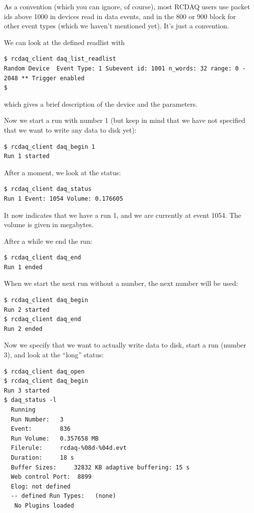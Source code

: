 \documentclass{article}[11pt]
\begin{document}
As a convention (which you can ignore, of course), most RCDAQ users
use packet ids above 1000 in devices read in data events, and in the
800 or 900 block for other event types (which we haven't mentioned
yet). It's just a convention.


We can look at the defined readlist with  

\begin{verbatim}
$ rcdaq_client daq_list_readlist
Random Device  Event Type: 1 Subevent id: 1001 n_words: 32 range: 0 - 2048 ** Trigger enabled
$ 
\end{verbatim}

which gives a brief description of the device and the parameters.

Now we start a run with number 1 (but keep in mind that we have not
specified that we want to write any data to disk yet):

\begin{verbatim}
$ rcdaq_client daq_begin 1
Run 1 started
\end{verbatim}

After a moment, we look at the status:

\begin{verbatim}
$ rcdaq_client daq_status 
Run 1 Event: 1054 Volume: 0.176605
\end{verbatim}

It now indicates that we have a run 1, and we are currently at event
1054. The volume is given in megabytes.

After a while we end the run:

\begin{verbatim}
$ rcdaq_client daq_end
Run 1 ended
\end{verbatim}

When we start the next run without a number, the next number will be used:

\begin{verbatim}
$ rcdaq_client daq_begin
Run 2 started
$ rcdaq_client daq_end
Run 2 ended
\end{verbatim}

Now we specify that we want to actually write data to disk, start a
run (number 3), and look at the ``long'' status:

\begin{verbatim}
$ rcdaq_client daq_open
$ rcdaq_client daq_begin
Run 3 started
$ daq_status -l
  Running
  Run Number:   3
  Event:        836
  Run Volume:   0.357658 MB
  Filerule:     rcdaq-%08d-%04d.evt
  Duration:     18 s
  Buffer Sizes:     32832 KB adaptive buffering: 15 s
  Web control Port:  8899
  Elog: not defined
  -- defined Run Types:   (none)
   No Plugins loaded
\end{verbatim}
\end{document}
